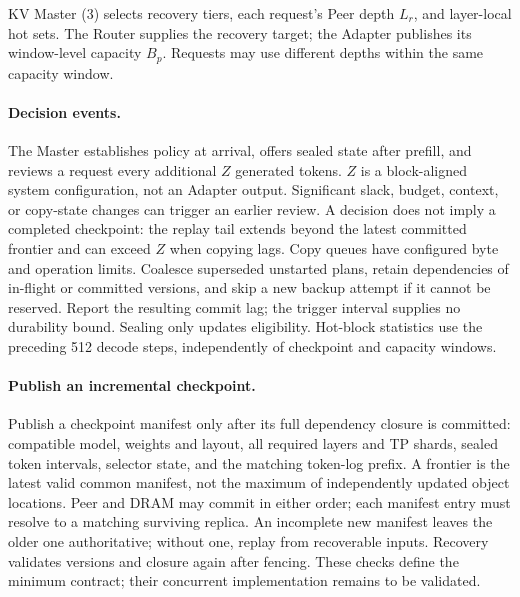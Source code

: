 KV Master (3) selects recovery tiers, each request's Peer depth $L_r$,
and layer-local hot sets. The Router supplies the recovery target;
the Adapter publishes its window-level capacity $B_p$. Requests may use
different depths within the same capacity window.

\paragraph{Decision events.}
The Master establishes policy at arrival, offers sealed state after prefill,
and reviews a request every additional $Z$ generated tokens. $Z$ is a
block-aligned system configuration, not an Adapter output. Significant
slack, budget, context, or copy-state changes can trigger an earlier review.
A decision does not imply a completed checkpoint: the replay tail extends
beyond the latest committed frontier and can exceed $Z$ when copying lags.
Copy queues have configured byte and operation limits. Coalesce superseded
unstarted plans, retain dependencies of in-flight or committed versions,
and skip a new backup attempt if it cannot be reserved. Report the resulting
commit lag; the trigger interval supplies no durability bound.
Sealing only updates eligibility. Hot-block statistics use the preceding
512 decode steps, independently of checkpoint and capacity windows.

\paragraph{Publish an incremental checkpoint.}
Publish a checkpoint manifest only after its full dependency closure is
committed: compatible model, weights and layout, all required layers and TP
shards, sealed token intervals, selector state, and the matching token-log
prefix. A frontier is the latest valid common manifest, not the maximum
of independently updated object locations. Peer and DRAM may commit in
either order; each manifest entry must resolve to a matching surviving
replica. An incomplete new manifest leaves the older one authoritative;
without one, replay from recoverable inputs. Recovery validates versions
and closure again after fencing. These checks define the minimum contract;
their concurrent implementation remains to be validated.

